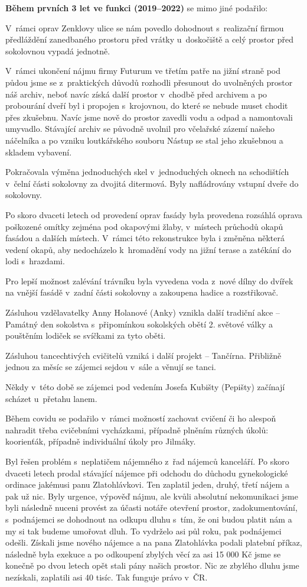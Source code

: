 \documentclass[11pt]{article}
\begin{document}
\textbf{Během prvních 3 let ve funkci (2019–2022)} se mimo jiné podařilo: 

V~rámci oprav Zenklovy ulice se nám povedlo dohodnout s~realizační firmou předláždění zanedbaného prostoru před vrátky u~doskočiště a celý prostor před sokolovnou vypadá jednotně. 

V~rámci ukončení nájmu firmy Futurum ve třetím patře na jižní straně pod půdou jsme se z~praktických důvodů rozhodli přesunout do uvolněných prostor náš archiv, neboť navíc získá další prostor v~chodbě před archivem a po probourání dveří byl i propojen s~krojovnou, do které se nebude muset chodit přes zkušebnu. Navíc jsme nově do prostor zavedli vodu a odpad a namontovali umyvadlo. Stávající archiv se původně uvolnil pro včelařské zázemí našeho náčelníka a po vzniku loutkářského souboru Nástup se stal jeho zkušebnou a skladem vybavení.

Pokračovala výměna jednoduchých skel v~jednoduchých oknech na schodištích v~čelní části sokolovny za dvojitá ditermová. Byly nafládrovány vstupní dveře do sokolovny.

Po skoro dvaceti letech od provedení oprav fasády byla provedena rozsáhlá oprava poškozené omítky zejména pod okapovými žlaby, v~místech průchodů okapů fasádou a dalších místech. V~rámci této rekonstrukce byla i změněna některá vedení okapů, aby nedocházelo k~hromadění vody na jižní terase a zatékání do lodi s~hrazdami.

Pro lepší možnost zalévání trávníku byla vyvedena voda z~nové dílny do dvířek na vnější fasádě v~zadní části sokolovny a zakoupena hadice a rozstřikovač.

Zásluhou vzdělavatelky Anny Holanové (Anky) vznikla další tradiční akce – Památný den sokolstva s~připomínkou sokolských obětí 2. světové války a pouštěním lodiček se svíčkami za tyto oběti.

Zásluhou tancechtivých cvičitelů vzniká i další projekt – Tančírna. Přibližně jednou za měsíc se zájemci sejdou v~sále a věnují se tanci.

Někdy v~této době se zájemci pod vedením Josefa Kubišty (Pepišty) začínají scházet u~přetahu lanem.  

Během covidu se podařilo v~rámci možností zachovat cvičení či ho alespoň nahradit třeba cvičebními vycházkami, případně plněním různých úkolů: koorienťák, případně individuální úkoly pro Jilmáky.

Byl řešen problém s~neplatičem nájemného z~řad nájemců kanceláří. Po skoro dvaceti letech prodal stávající nájemce při odchodu do důchodu gynekologické ordinace jakémusi panu Zlatohlávkovi. Ten zaplatil jeden, druhý, třetí nájem a pak už nic. Byly urgence, výpověď nájmu, ale kvůli absolutní nekomunikaci jsme byli následně nuceni provést za účasti notáře otevření prostor, zadokumentování, s~podnájemci se dohodnout na odkupu dluhu s~tím, že oni budou platit nám a my si tak budeme umořovat dluh. To vydrželo asi půl roku, pak podnájemci odešli. Získali jsme nového nájemce a na pana Zlatohlávka podali platební příkaz, následně byla exekuce a po odkoupení zbylých věcí za asi 15 000 Kč jsme se konečně po dvou letech opět stali pány našich prostor. Nic ze zbylého dluhu jsme nezískali, zaplatili asi 40 tisíc. Tak funguje právo v~ČR.
\end{document}
